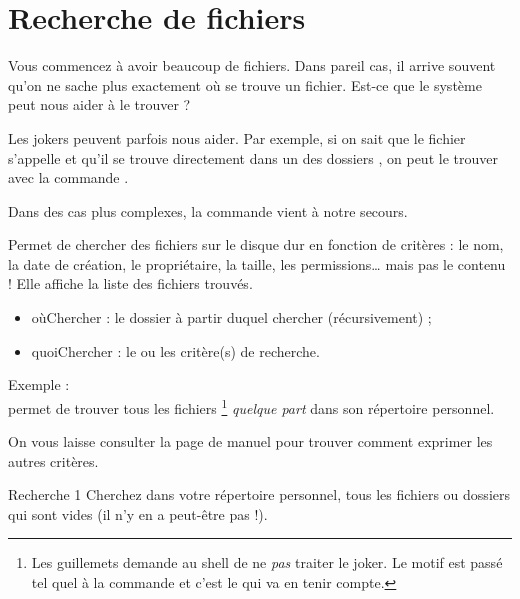 \documentclass[a4paper,11pt]{style-esi/td}
\begin{document}
\section{Recherche de fichiers}

	Vous commencez à avoir beaucoup de fichiers.
	Dans pareil cas, 
	il arrive souvent qu'on ne sache plus exactement où se trouve un fichier.
	Est-ce que le système peut nous aider à le trouver ?

	Les jokers peuvent parfois nous aider.
	Par exemple, si on sait que le fichier s'appelle 
	et qu'il se trouve directement dans un des dossiers ,
	on peut le trouver avec 
	la commande .
	
	Dans des cas plus complexes, la commande  vient à notre secours.

	\medskip
	\begin{coltbox}{}
		
		\medskip
		Permet de chercher des fichiers
		sur le disque dur en fonction de critères :
		le nom, la date de création, le propriétaire, la taille,
		les permissions\dots{}  {\color{colalert}mais pas le contenu !}
		Elle affiche la liste des fichiers trouvés.
		\begin{itemize}
		\item \og{}oùChercher\fg{} : le dossier à partir duquel chercher (récursivement) ;
		\item \og{}quoiChercher\fg{} : le ou les critère(s) de recherche.
		\end{itemize}
	\end{coltbox}

	\medskip
	Exemple : 
	\\permet de trouver tous les fichiers %
	\footnote{
		Les guillemets demande au shell de ne \emph{pas}
		traiter le joker. Le motif est passé tel quel à la commande
		et c'est le  qui va en tenir compte.
	} \emph{quelque part}
	dans son répertoire personnel.

	On vous laisse consulter la page de manuel pour trouver comment
	exprimer les autres critères.

	\begin{Exercice}{Recherche 1}
		Cherchez dans votre répertoire personnel,
		tous les fichiers ou dossiers qui sont vides
		(il n'y en a peut-être pas !).
	\end{Exercice}
\end{document}
